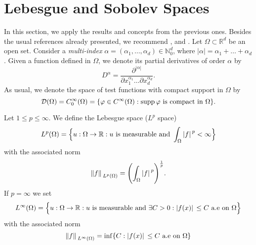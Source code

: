\section{Lebesgue and Sobolev Spaces}\label{lebesgue_and_sobolev_preliminaries}
In this section, we apply the results and concepts from the previous ones. Besides the usual references already presented, we recommend \cite{lions2012non}, \cite{huguinho} and \cite{evans2022partial}. Let $\Omega \subset \mathbb{R}^d$ be an open set. Consider a \textit{multi-index} $\alpha = (\alpha_1, \dots, \alpha_d) \in \mathbb{N}_0^d$, where $|\alpha| = \alpha_1 + \dots + \alpha_d$. Given a function defined in $\Omega$, we denote its partial derivatives of order $\alpha$ by
\[
D^\alpha = \frac{\partial^{|\alpha|}}{\partial x_1^{\alpha_1}\dots\partial x_d^{\alpha_d}}.   
\]
As usual, we denote the space of test functions with compact support in $\Omega$ by
\[
\mathcal{D}(\Omega) = C_0^\infty(\Omega) = \{\varphi \in C^\infty(\Omega) : \operatorname{supp}\varphi \text{ is compact in }\Omega\}.
\]

\begin{definition}
    Let \(1 \leq p \leq \infty\). We define the Lebesgue space (\(L^p\) space)
    \[
        L^p(\Omega) = \Big\{u: \Omega \rightarrow \mathbb{R}: u \text{ is measurable and } \int_\Omega \abs*{f}^p < \infty\Big\}
    \]
    with the associated norm
    \[
        \norm*{f}_{L^p(\Omega)} = \Biggl(\int_\Omega \abs*{f}^p\Biggr)^{\frac{1}{p}}.
    \]
    If \(p=\infty\) we set
    \[
        L^\infty(\Omega) = \Big\{u: \Omega \rightarrow \mathbb{R}: u \text{ is measurable and } \exists C > 0: \abs*{f(x)} \leq C \text{ a.e on } \Omega \Big\}
    \]
    with the associated norm
    \[
        \norm*{f}_{L^\infty(\Omega)} = \inf \{C: \abs*{f(x)} \leq C \text{ a.e on } \Omega\}
    \]
\end{definition}

